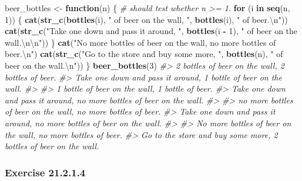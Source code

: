 \documentclass[]{book}
\newenvironment{Shaded}{\begin{snugshade}}{\end{snugshade}}
\newcommand{\CharTok}[1]{\textcolor[rgb]{0.31,0.60,0.02}{#1}}
\newcommand{\CommentTok}[1]{\textcolor[rgb]{0.56,0.35,0.01}{\textit{#1}}}
\newcommand{\ControlFlowTok}[1]{\textcolor[rgb]{0.13,0.29,0.53}{\textbf{#1}}}
\newcommand{\DecValTok}[1]{\textcolor[rgb]{0.00,0.00,0.81}{#1}}
\newcommand{\KeywordTok}[1]{\textcolor[rgb]{0.13,0.29,0.53}{\textbf{#1}}}
\newcommand{\NormalTok}[1]{#1}
\newcommand{\OperatorTok}[1]{\textcolor[rgb]{0.81,0.36,0.00}{\textbf{#1}}}
\newcommand{\StringTok}[1]{\textcolor[rgb]{0.31,0.60,0.02}{#1}}
\theoremstyle{plain}
\theoremstyle{remark}
\begin{document}
\begin{enumerate}
\begin{Shaded}
\begin{Highlighting}[]
\NormalTok{beer_bottles <-}\StringTok{ }\ControlFlowTok{function}\NormalTok{(n) \{}
  \CommentTok{# should test whether n >= 1.}
  \ControlFlowTok{for}\NormalTok{ (i }\ControlFlowTok{in} \KeywordTok{seq}\NormalTok{(n, }\DecValTok{1}\NormalTok{)) \{}
     \KeywordTok{cat}\NormalTok{(}\KeywordTok{str_c}\NormalTok{(}\KeywordTok{bottles}\NormalTok{(i), }\StringTok{" of beer on the wall, "}\NormalTok{, }\KeywordTok{bottles}\NormalTok{(i), }\StringTok{" of beer.}\CharTok{\textbackslash{}n}\StringTok{"}\NormalTok{))}
     \KeywordTok{cat}\NormalTok{(}\KeywordTok{str_c}\NormalTok{(}\StringTok{"Take one down and pass it around, "}\NormalTok{, }\KeywordTok{bottles}\NormalTok{(i }\OperatorTok{-}\StringTok{ }\DecValTok{1}\NormalTok{),}
                \StringTok{" of beer on the wall.}\CharTok{\textbackslash{}n\textbackslash{}n}\StringTok{"}\NormalTok{))}
\NormalTok{  \}}
  \KeywordTok{cat}\NormalTok{(}\StringTok{"No more bottles of beer on the wall, no more bottles of beer.}\CharTok{\textbackslash{}n}\StringTok{"}\NormalTok{)}
  \KeywordTok{cat}\NormalTok{(}\KeywordTok{str_c}\NormalTok{(}\StringTok{"Go to the store and buy some more, "}\NormalTok{, }\KeywordTok{bottles}\NormalTok{(n), }\StringTok{" of beer on the wall.}\CharTok{\textbackslash{}n}\StringTok{"}\NormalTok{))}
\NormalTok{\}}
\KeywordTok{beer_bottles}\NormalTok{(}\DecValTok{3}\NormalTok{)}
\CommentTok{#> 2 bottles of beer on the wall, 2 bottles of beer.}
\CommentTok{#> Take one down and pass it around, 1 bottle of beer on the wall.}
\CommentTok{#> }
\CommentTok{#> 1 bottle of beer on the wall, 1 bottle of beer.}
\CommentTok{#> Take one down and pass it around, no more bottles of beer on the wall.}
\CommentTok{#> }
\CommentTok{#> no more bottles of beer on the wall, no more bottles of beer.}
\CommentTok{#> Take one down and pass it around, no more bottles of beer on the wall.}
\CommentTok{#> }
\CommentTok{#> No more bottles of beer on the wall, no more bottles of beer.}
\CommentTok{#> Go to the store and buy some more, 2 bottles of beer on the wall.}
\end{Highlighting}
\end{Shaded}
\end{enumerate}

\hypertarget{exercise-21.2.1.4}{%
\subsubsection*{\texorpdfstring{Exercise
{21.2.1.4}}{Exercise 21.2.1.4}}\label{exercise-21.2.1.4}}
\end{document}
